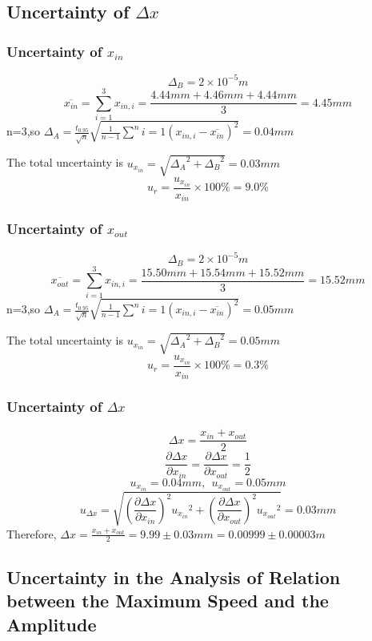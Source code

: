 \documentclass[12pt,a4paper]{article}
\begin{document}
\subsection{Uncertainty of $\Delta x$}

\subsubsection{Uncertainty of $x_{in}$}
$$\Delta_B=2\times 10^{-5}m$$
$$\overline{x_{in}}=\sum^3_{i=1}x_{in,i}=\frac{4.44mm+4.46mm+4.44mm}{3}=4.45mm$$
n=3,so $\Delta_A=\frac{t_{0.95}}{\sqrt{n}}\sqrt{\frac{1}{n-1}\sum^n{i=1}(x_{in,i}-\overline{x_{in}})^2}=0.04mm$\par 
The total uncertainty is $u_{x_{in}}=\sqrt{{\Delta_A}^2+{\Delta_B}^2}=0.03mm$
$$u_{r}=\frac{u_{x_{in}}}{x_{in}}\times 100\%=9.0\%$$

\subsubsection{Uncertainty of $x_{out}$}
$$\Delta_B=2\times 10^{-5}m$$
$$\overline{x_{out}}=\sum^3_{i=1}x_{in,i}=\frac{15.50mm+15.54mm+15.52mm}{3}=15.52mm$$
n=3,so $\Delta_A=\frac{t_{0.95}}{\sqrt{n}}\sqrt{\frac{1}{n-1}\sum^n{i=1}(x_{in,i}-\overline{x_{in}})^2}=0.05mm$\par 
The total uncertainty is $u_{x_{in}}=\sqrt{{\Delta_A}^2+{\Delta_B}^2}=0.05mm$
$$u_{r}=\frac{u_{x_{in}}}{x_{in}}\times 100\%=0.3\%$$

\subsubsection{Uncertainty of $\Delta x$}
$$\Delta x=\frac{x_{in}+x_{out}}{2}$$
$$\frac{\partial \Delta x}{\partial x_{in}}=\frac{\partial \Delta x}{\partial x_{out}}=\frac{1}{2}$$
$$u_{x_{in}}=0.04mm,~~u_{x_{out}}=0.05mm$$
$$u_{\Delta x}=\sqrt{(\frac{\partial \Delta x}{\partial x_{in}})^2{u_{x_{in}}}^2+(\frac{\partial \Delta x}{\partial x_{out}})^2{u_{x_{out}}}^2}=0.03mm$$
Therefore, $\Delta x=\frac{x_{in}+x_{out}}{2}=9.99\pm0.03mm=0.00999\pm0.00003m$

\subsection{ Uncertainty in the Analysis of Relation between the Maximum Speed and the Amplitude}
\end{document}
